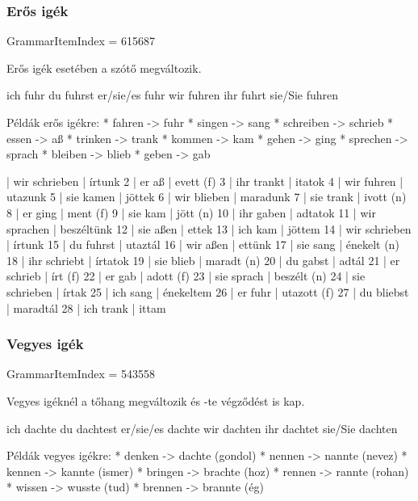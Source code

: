 \documentclass{article}
\newenvironment{desc}{\verbatim}{\endverbatim}
\newenvironment{exmp}{\verbatim}{\endverbatim}
\begin{document}
\subsubsection{Erős igék}

GrammarItemIndex = 615687

\begin{desc}
Erős igék esetében a szótő megváltozik.

ich fuhr
du fuhrst
er/sie/es fuhr
wir fuhren
ihr fuhrt
sie/Sie fuhren

Példák erős igékre:
* fahren -> fuhr
* singen -> sang
* schreiben -> schrieb
* essen -> aß
* trinken -> trank
* kommen -> kam
* gehen -> ging
* sprechen -> sprach
* bleiben -> blieb
* geben -> gab
\end{desc}

\begin{exmp}
1 | wir schrieben | írtunk
2 | er aß | evett (f)
3 | ihr trankt | itatok
4 | wir fuhren | utazunk
5 | sie kamen | jöttek
6 | wir blieben | maradunk
7 | sie trank | ivott (n)
8 | er ging | ment (f)
9 | sie kam | jött (n)
10 | ihr gaben | adtatok
11 | wir sprachen | beszéltünk
12 | sie aßen | ettek
13 | ich kam | jöttem
14 | wir schrieben | írtunk
15 | du fuhrst | utaztál
16 | wir aßen | ettünk
17 | sie sang | énekelt (n)
18 | ihr schriebt | írtatok
19 | sie blieb | maradt (n)
20 | du gabst | adtál
21 | er schrieb | írt (f)
22 | er gab | adott (f)
23 | sie sprach | beszélt (n)
24 | sie schrieben | írtak
25 | ich sang | énekeltem
26 | er fuhr | utazott (f)
27 | du bliebst | maradtál
28 | ich trank | ittam
\end{exmp}

\subsubsection{Vegyes igék}

GrammarItemIndex = 543558

\begin{desc}
Vegyes igéknél a tőhang megváltozik és -te végződést is kap.

ich dachte
du dachtest
er/sie/es dachte
wir dachten
ihr dachtet
sie/Sie dachten

Példák vegyes igékre:
* denken -> dachte (gondol)
* nennen -> nannte (nevez)
* kennen -> kannte (ismer)
* bringen -> brachte (hoz)
* rennen -> rannte (rohan)
* wissen -> wusste (tud)
* brennen -> brannte (ég)
\end{desc}
\end{document}
